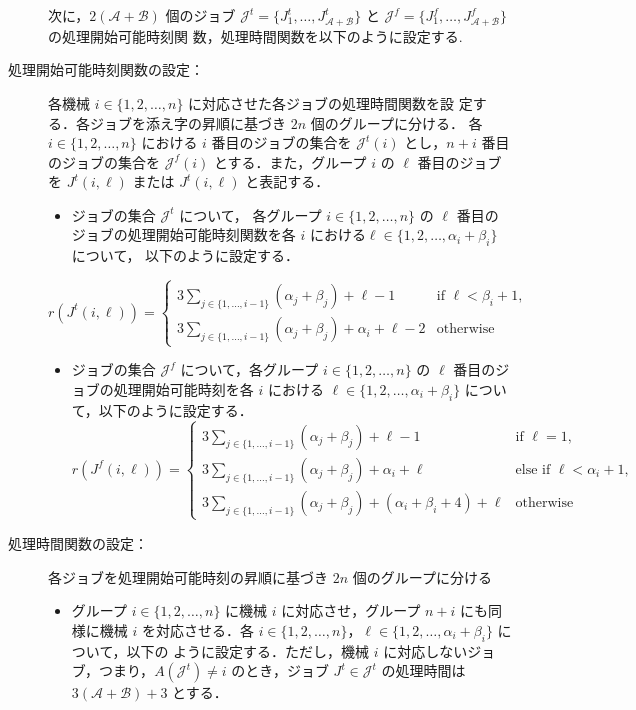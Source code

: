 \documentclass[12pt]{optlab-bachelor}
\begin{document}
\begin{description}
  \item[] 次に，$2(\mathcal{A} + \mathcal{B})$ 個のジョブ $\mathcal{J}^t =
  \{J^t_1,\ldots,J^t_{\mathcal{A} + \mathcal{B}}\}$ と $\mathcal{J}^f =
  \{J^f_1,\ldots,J^f_{\mathcal{A} + \mathcal{B}}\}$ の処理開始可能時刻関
  数，処理時間関数を以下のように設定する.
  \item[処理開始可能時刻関数の設定：] 各機械 $i \in \{1,2,\ldots,n\}$ に対応させた各ジョブの処理時間関数を設
  定する．各ジョブを添え字の昇順に基づき $2n$ 個のグループに分ける． 各 $i
  \in \{1,2,\ldots,n\}$ における $i$ 番目のジョブの集合を
  $\mathcal{J}^t(i)$ とし，$n + i$ 番目のジョブの集合を
  $\mathcal{J}^f(i)$ とする．また，グループ $i$ の $\ell$ 番目のジョブ
  を $J^t(i,\ell)$ または $J^t(i,\ell)$ と表記する．
  \begin{itemize}
    \item ジョブの集合 $\mathcal{J}^t$ について， 各グループ $i \in
    \{1,2,\ldots, n\}$ の $\ell$ 番目のジョブの処理開始可能時刻関数を各
    $i$ における$\ell \in \{1,2,\ldots, \alpha_i + \beta_i\}$ について，
    以下のように設定する．
  \end{itemize}
  $$r(J^t(i,\ell)) =
  \left\{ \begin{array}{lll} 3 \displaystyle
  \sum_{j \in \{1,\ldots,i - 1\}}(\alpha_j + \beta_j) + \ell - 1 &
  \text{if } \ell < \beta_i + 1, \\ 3 \displaystyle \sum_{j \in \{1,\ldots,i - 1\}}(\alpha_j + \beta_j) + \alpha_i + \ell - 2 & \text{otherwise} \end{array} \right.$$
  \begin{itemize}
    \item ジョブの集合 $\mathcal{J}^f$ について，各グループ $i \in \{1,2,\ldots, n\}$ の $\ell$ 番目のジョブの処理開始可能時刻を各 $i$ における $\ell \in \{1,2,\ldots,\alpha_i + \beta_i\}$ について，以下のように設定する．
    $$r(J^f(i,\ell)) =
    \left\{ \begin{array}{lll} 3 \displaystyle \sum_{j \in \{1,\ldots,i
    - 1\}}(\alpha_j + \beta_j) + \ell - 1 & \text{if } \ell = 1,
    \\ 3\displaystyle \sum_{j \in \{1,\ldots,i - 1\}}(\alpha_j + \beta_j) + \alpha_i + \ell  &
    \text{else if } \ell < \alpha_i + 1 , \\ 3\displaystyle \sum_{j \in \{1,\ldots,i - 1\}}(\alpha_j + \beta_j) + (\alpha_i + \beta_i + 4) + \ell & \text{otherwise} \end{array} \right.$$
  \end{itemize}
  \item[処理時間関数の設定：] 各ジョブを処理開始可能時刻の昇順に基づき $2n$ 個のグループに分ける
  \begin{itemize}
    \item グループ $i \in \{1,2,\ldots,n\}$ に機械 $i$ に対応させ，グループ
    $n + i$ にも同様に機械 $i$ を対応させる．各 $i \in \{1,2,\ldots,
    n\}$，$\ell \in \{1,2,\ldots, \alpha_i + \beta_i\}$ について，以下の
    ように設定する．ただし，機械 $i$ に対応しないジョブ，つまり，$A(\mathcal{J}^t)  \neq i$ のとき，ジョブ $J^t \in \mathcal{J}^t$ の処理時間は $3(\mathcal{A} + \mathcal{B}) + 3$ とする．
  \end{itemize}
\end{description}
\end{document}
